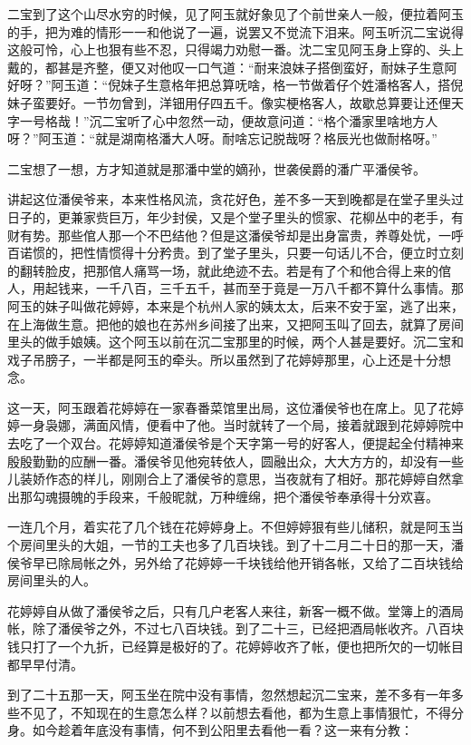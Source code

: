 \documentclass[12pt,UTF8]{ctexbook}
\begin{document}
{{{二宝到了这个山尽水穷的时候，见了阿玉就好象见了个前世亲人一般，便拉着阿玉的手，把为难的情形一一和他说了一遍，说罢又不觉流下泪来。阿玉听沉二宝说得这般可怜，心上也狠有些不忍，只得竭力劝慰一番。沈二宝见阿玉身上穿的、头上戴的，都甚是齐整，便又对他叹一口气道：“耐来浪妹子搭倒蛮好，耐妹子生意阿好呀？”阿玉道：“倪妹子生意格年把总算呒啥，格一节做着仔个姓潘格客人，搭倪妹子蛮要好。一节勿曾到，洋钿用仔四五千。像实梗格客人，故歇总算要让还俚天字一号格哉！”沉二宝听了心中忽然一动，便故意问道：“格个潘家里啥地方人呀？”阿玉道：“就是湖南格潘大人呀。耐啥忘记脱哉呀？格辰光也做耐格呀。”

二宝想了一想，方才知道就是那潘中堂的嫡孙，世袭侯爵的潘广平潘侯爷。

讲起这位潘侯爷来，本来性格风流，贪花好色，差不多一天到晚都是在堂子里头过日子的，更兼家赀巨万，年少封侯，又是个堂子里头的惯家、花柳丛中的老手，有财有势。那些倌人那一个不巴结他？但是这潘侯爷却是出身富贵，养尊处忧，一呼百诺惯的，把性情惯得十分矜贵。到了堂子里头，只要一句话儿不合，便立时立刻的翻转脸皮，把那倌人痛骂一场，就此绝迹不去。若是有了个和他合得上来的倌人，用起钱来，一千八百，三千五千，甚而至于竟是一万八千都不算什么事情。那阿玉的妹子叫做花婷婷，本来是个杭州人家的姨太太，后来不安于室，逃了出来，在上海做生意。把他的娘也在苏州乡间接了出来，又把阿玉叫了回去，就算了房间里头的做手娘姨。这个阿玉以前在沉二宝那里的时候，两个人甚是要好。沉二宝和戏子吊膀子，一半都是阿玉的牵头。所以虽然到了花婷婷那里，心上还是十分想念。

这一天，阿玉跟着花婷婷在一家春番菜馆里出局，这位潘侯爷也在席上。见了花婷婷一身袅娜，满面风情，便看中了他。当时就转了一个局，接着就跟到花婷婷院中去吃了一个双台。花婷婷知道潘侯爷是个天字第一号的好客人，便提起全付精神来殷殷勤勤的应酬一番。潘侯爷见他宛转依人，圆融出众，大大方方的，却没有一些儿装娇作态的样儿，刚刚合上了潘侯爷的意思，当夜就有了相好。那花婷婷自然拿出那勾魂摄魄的手段来，千般昵就，万种缠绵，把个潘侯爷奉承得十分欢喜。

一连几个月，着实花了几个钱在花婷婷身上。不但婷婷狠有些儿储积，就是阿玉当个房间里头的大姐，一节的工夫也多了几百块钱。到了十二月二十日的那一天，潘侯爷早已除局帐之外，另外给了花婷婷一千块钱给他开销各帐，又给了二百块钱给房间里头的人。

花婷婷自从做了潘侯爷之后，只有几户老客人来往，新客一概不做。堂簿上的酒局帐，除了潘侯爷之外，不过七八百块钱。到了二十三，已经把酒局帐收齐。八百块钱只打了一个九折，已经算是极好的了。花婷婷收齐了帐，便也把所欠的一切帐目都早早付清。

到了二十五那一天，阿玉坐在院中没有事情，忽然想起沉二宝来，差不多有一年多些不见了，不知现在的生意怎么样？以前想去看他，都为生意上事情狠忙，不得分身。如今趁着年底没有事情，何不到公阳里去看他一看？这一来有分教：

}}}
\end{document}
